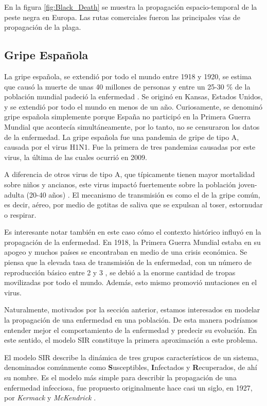 En la figura \ref{fig:Black_Death} se muestra la propagación espacio-temporal de la peste negra en Europa. Las rutas comerciales fueron las principales vías de 
propagación de la plaga.

\subsection*{Gripe Española}

La gripe española, se extendió por todo el mundo entre 1918 y 1920, se estima que causó la muerte de unas 40 millones de personas y entre un 25-30 \% de la 
población mundial padeció la enfermedad \cite{gripe2}. Se originó en Kansas, Estados Unidos, y se extendió por todo el mundo en menos de un año. Curiosamente, se denominó gripe
española simplemente porque España no participó en la Primera Guerra Mundial que acontecía simultáneamente, por lo tanto, no se censuraron los datos de la enfermedad.
La gripe española fue una pandemia de gripe de tipo A, causada por el virus H1N1. Fue la primera de tres pandemias causadas por este virus, la última de
las cuales ocurrió en 2009. 

A diferencia de otros virus de tipo A, que típicamente tienen mayor mortalidad sobre niños y ancianos, este virus impactó fuertemente sobre la población 
joven-adulta (20-40 años) \cite{gripe3}. El mecanismo de transmisión es como el de la gripe común, es decir, aéreo, por 
medio de gotitas de saliva que se expulsan al toser, estornudar o respirar.

Es interesante notar también en este caso cómo el contexto histórico influyó en la propagación de la enfermedad. En 1918, la Primera Guerra Mundial estaba en su apogeo y 
muchos países se encontraban en medio de una crisis económica. Se piensa que la elevada tasa de transmisión de la enfermedad, con un número de reproducción básico entre 
2 y 3 \cite{gripe}, se debió a la enorme cantidad de tropas movilizadas por todo el mundo. Además, esto mismo promovió mutaciones en el virus. 




Naturalmente, motivados por la sección anterior, estamos interesados en modelar la propagación de una enfermedad en una población. De esta manera podríamos entender 
mejor el comportamiento de la enfermedad y predecir su evolución. En este sentido, el modelo SIR constituye la primera aproximación a este problema.

El modelo SIR describe la dinámica de tres grupos característicos de un sistema, denominados comúnmente como \textbf{S}usceptibles, \textbf{I}nfectados y
\textbf{R}ecuperados, de ahí su nombre. Es el modelo más simple para describir la propagación de una enfermedad 
infecciosa, fue propuesto originalmente hace casi un siglo, en 1927, por \textit{Kermack} y \textit{McKendrick} \cite{SIR}. 

